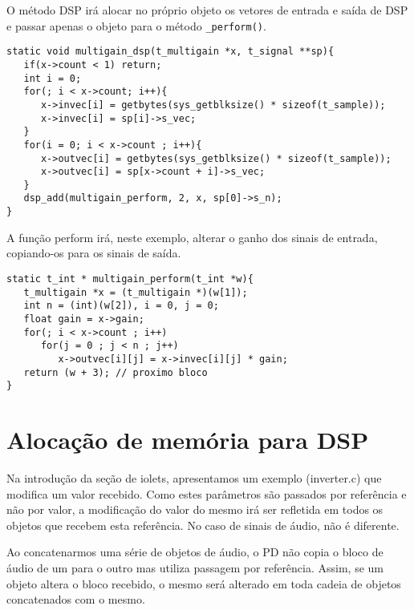 O método DSP irá alocar no próprio objeto os vetores de entrada e saída de DSP e
passar apenas o objeto para o método \texttt{\_perform()}.

\begin{lstlisting}[caption=Método DSP para iolets DSP dinâmicos]
static void multigain_dsp(t_multigain *x, t_signal **sp){
   if(x->count < 1) return;
   int i = 0;
   for(; i < x->count; i++){
      x->invec[i] = getbytes(sys_getblksize() * sizeof(t_sample));
      x->invec[i] = sp[i]->s_vec;
   }
   for(i = 0; i < x->count ; i++){
      x->outvec[i] = getbytes(sys_getblksize() * sizeof(t_sample));
      x->outvec[i] = sp[x->count + i]->s_vec;
   }
   dsp_add(multigain_perform, 2, x, sp[0]->s_n);
}
\end{lstlisting}

A função perform irá, neste exemplo, alterar o ganho dos sinais de entrada,
copiando-os para os sinais de saída.

\begin{lstlisting}[caption=Método Perform para iolets DSP dinâmicos]
static t_int * multigain_perform(t_int *w){
   t_multigain *x = (t_multigain *)(w[1]);
   int n = (int)(w[2]), i = 0, j = 0;
   float gain = x->gain;
   for(; i < x->count ; i++)
      for(j = 0 ; j < n ; j++)
         x->outvec[i][j] = x->invec[i][j] * gain;
   return (w + 3); // proximo bloco
}
\end{lstlisting}

\section{Alocação de memória para DSP}

Na introdução da seção de iolets, apresentamos um exemplo (inverter.c) que
modifica um valor recebido.
Como estes parâmetros são passados por referência e não por valor, a modificação
do valor do mesmo irá ser refletida em todos os objetos que recebem esta referência.
No caso de sinais de áudio, não é diferente.

Ao concatenarmos uma série de objetos de áudio, o PD não copia o bloco de áudio
de um para o outro mas utiliza passagem por referência.
Assim, se um objeto altera o bloco recebido, o mesmo será alterado em toda cadeia
de objetos concatenados com o mesmo.

